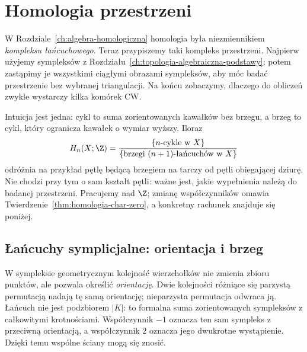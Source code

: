 \chapter{Homologia przestrzeni}
\label{ch:homologia-przestrzeni}

W Rozdziale~\ref{ch:algebra-homologiczna} homologia była
niezmiennikiem \emph{kompleksu łańcuchowego}.
Teraz przypiszemy taki kompleks przestrzeni. Najpierw
użyjemy sympleksów z Rozdziału~\ref{ch:topologia-algebraiczna-podstawy};
potem zastąpimy je wszystkimi ciągłymi obrazami sympleksów,
aby móc badać przestrzenie bez wybranej triangulacji. Na końcu
zobaczymy, dlaczego do obliczeń zwykle wystarczy
kilka komórek CW.

Intuicja jest jedna: cykl to suma zorientowanych kawałków
bez brzegu, a brzeg to cykl, który ogranicza kawałek
o wymiar wyższy. Iloraz
\[
 H_n(X;\Z)=
 \frac{\{\text{$n$-cykle w $X$}\}}
 {\{\text{brzegi $(n+1)$-łańcuchów w $X$}\}}
\]
odróżnia na przykład pętlę będącą brzegiem na tarczy od pętli
obiegającej dziurę. Nie chodzi przy tym o sam kształt pętli:
ważne jest, jakie wypełnienia należą do badanej przestrzeni.
Pracujemy nad $\Z$; zmianę
współczynników omawia
Twierdzenie~\ref{thm:homologia-char-zero},
a konkretny rachunek znajduje się poniżej.

\section{Łańcuchy symplicjalne: orientacja i brzeg}
\label{sec:homologia-symplicjalna}

W sympleksie geometrycznym kolejność wierzchołków nie zmienia
zbioru punktów, ale pozwala określić \emph{orientację}.
Dwie kolejności różniące się parzystą permutacją nadają tę samą
orientację; nieparzysta permutacja odwraca ją. Łańcuch nie jest
podzbiorem $|K|$: to formalna suma zorientowanych sympleksów
z całkowitymi krotnościami. Współczynnik $-1$ oznacza ten sam
sympleks z przeciwną orientacją, a współczynnik $2$ oznacza jego
dwukrotne wystąpienie. Dzięki temu wspólne ściany mogą się znosić.

